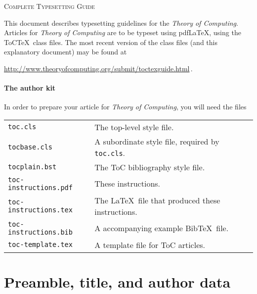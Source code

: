 \documentclass{article}
\theoremstyle{plain}
\theoremstyle{definition}
\begin{document}
\newpage
\begin{center}
\Large{\textsc{Complete Typesetting Guide}}
\end{center}

This document describes typesetting guidelines for the \emph{Theory
of Computing}. Articles for \emph{Theory of Computing} are to be
typeset using pdf\LaTeX, using the ToC\TeX\ class files. The most
recent version of the class files (and this explanatory document) may
be found at
\begin{center}
  \url{http://www.theoryofcomputing.org/submit/toctexguide.html}\,.
\end{center}

\paragraph{The author kit}
In order to prepare your article for \textsl{Theory of Computing}, you
will need the files
\begin{center}
\begin{tabular}{ll}
\texttt{toc.cls} & The top-level style file.\\
\texttt{tocbase.cls} & A subordinate style file, required by
\texttt{toc.cls}.\\
\texttt{tocplain.bst} & The ToC bibliography style file.\\
\texttt{toc-instructions.pdf} & These instructions.\\
\texttt{toc-instructions.tex} & The \LaTeX\ file that produced these instructions.\\
\texttt{toc-instructions.bib} & A accompanying example Bib\TeX\ file.\\
\texttt{toc-template.tex} & A template file for ToC articles. 
\end{tabular}
\end{center}


\section{Preamble, title, and author data}
\end{document}

